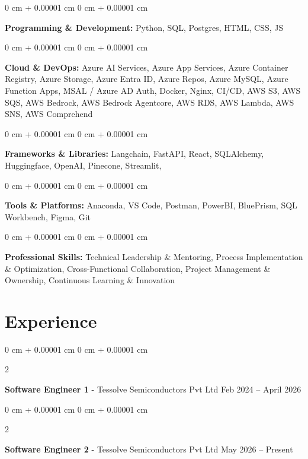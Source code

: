 \documentclass[10pt, letterpaper]{article}
\newenvironment{onecolentry}{
    \begin{adjustwidth}{
        0 cm + 0.00001 cm
    }{
        0 cm + 0.00001 cm
    }
}{
    \end{adjustwidth}
} %
\newenvironment{twocolentry}[2][]{
    \onecolentry
    \def\secondColumn{#2}
    \setcolumnwidth{\fill, 4.5 cm}
    \begin{paracol}{2}
}{
    \switchcolumn \raggedleft \secondColumn
    \end{paracol}
    \endonecolentry
} %
\begin{document}
        \begin{onecolentry}
            \textbf{Programming \& Development:} Python, SQL, Postgres, HTML, CSS, JS
        \end{onecolentry}

        \vspace{0.2 cm}

        \begin{onecolentry}
            \textbf{Cloud \& DevOps:} Azure AI Services, Azure App Services, Azure Container Registry, Azure Storage, Azure Entra ID, Azure Repos, Azure MySQL, Azure Function Apps, MSAL / Azure AD Auth, Docker, Nginx, CI/CD, AWS S3, AWS SQS, AWS Bedrock, AWS Bedrock Agentcore, AWS RDS, AWS Lambda, AWS SNS, AWS Comprehend
        \end{onecolentry}

        \vspace{0.2 cm}

        \begin{onecolentry}
            \textbf{Frameworks \& Libraries:} Langchain, FastAPI, React, SQLAlchemy, Huggingface, OpenAI, Pinecone, Streamlit,
        \end{onecolentry}

        \vspace{0.2 cm}

        \begin{onecolentry}
            \textbf{Tools \& Platforms:} Anaconda, VS Code, Postman, PowerBI, BluePrism, SQL Workbench, Figma, Git
        \end{onecolentry}

        \vspace{0.2 cm}

        \begin{onecolentry}
            \textbf{Professional Skills:} Technical Leadership \& Mentoring, Process Implementation \& Optimization, Cross-Functional Collaboration, Project Management \& Ownership, Continuous Learning \& Innovation
        \end{onecolentry}

    
    \section{Experience}
        
        \begin{twocolentry}{
            Feb 2024 – April 2026
        }
            \textbf{Software Engineer 1} - Tessolve Semiconductors Pvt Ltd\end{twocolentry}
        \begin{twocolentry}{
            May 2026 – Present
        }
            \textbf{Software Engineer 2} - Tessolve Semiconductors Pvt Ltd\end{twocolentry}
\end{document}
